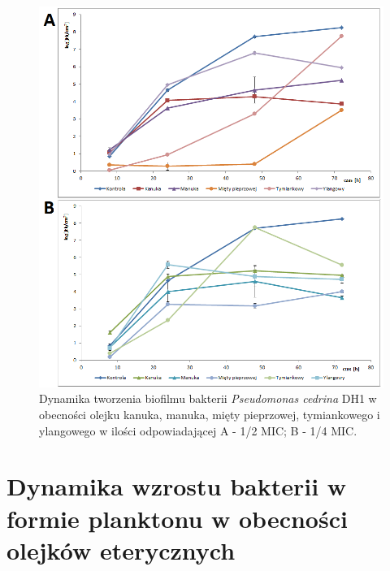 \documentclass[11pt,a4paper]{report}
\begin{document}
\begin{figure}[!h]
\begin{center}
\includegraphics[scale=0.7]{img/dh2-b.png}
\caption{Dynamika tworzenia biofilmu bakterii \textit{Pseudomonas cedrina} DH1 w obecności olejku kanuka, manuka, mięty pieprzowej, tymiankowego i ylangowego w ilości odpowiadającej A - 1/2 MIC; B - 1/4 MIC.}\label{dh2-b}
\end{center} 
\end{figure}

\clearpage

\section{Dynamika wzrostu bakterii w formie planktonu w obecności olejków eterycznych}
\end{document}
